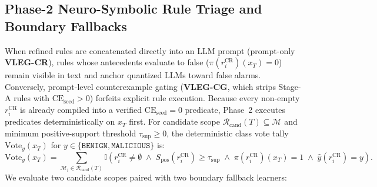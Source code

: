 \documentclass[11pt,letterpaper,onecolumn]{article}
\begin{document}
\subsection{Phase-2 Neuro-Symbolic Rule Triage and Boundary Fallbacks}
When refined rules are concatenated directly into an LLM prompt (prompt-only \textbf{VLEG-CR}), rules whose antecedents evaluate to false ($\pi(r_i^{\mathrm{CR}})(x_T) = 0$) remain visible in text and anchor quantized LLMs toward false alarms. Conversely, prompt-level counterexample gating (\textbf{VLEG-CG}, which strips Stage-A rules with $\mathrm{CE}_{\mathrm{seed}}>0$) forfeits explicit rule execution. Because every non-empty $r_i^{\mathrm{CR}}$ is already compiled into a verified $\mathrm{CE}_{\mathrm{seed}}=0$ predicate, Phase~2 executes predicates deterministically on $x_T$ first. For candidate scope $\mathcal{R}_{\mathrm{cand}}(T) \subseteq \mathcal{M}$ and minimum positive-support threshold $\tau_{\mathrm{sup}} \ge 0$, the deterministic class vote tally $\mathrm{Vote}_y(x_T)$ for $y \in \{\texttt{BENIGN}, \texttt{MALICIOUS}\}$ is:
\begin{equation}
\label{eq:ns_votes}
    \mathrm{Vote}_y(x_T) = \sum_{\mathcal{M}_i \in \mathcal{R}_{\mathrm{cand}}(T)} \mathbb{I}\!\left(r_i^{\mathrm{CR}} \neq \emptyset \;\wedge\; S_{\mathrm{pos}}(r_i^{\mathrm{CR}}) \ge \tau_{\mathrm{sup}} \;\wedge\; \pi(r_i^{\mathrm{CR}})(x_T) = 1 \;\wedge\; \hat{y}(r_i^{\mathrm{CR}}) = y\right).
\end{equation}
We evaluate two candidate scopes paired with two boundary fallback learners:
\end{document}
